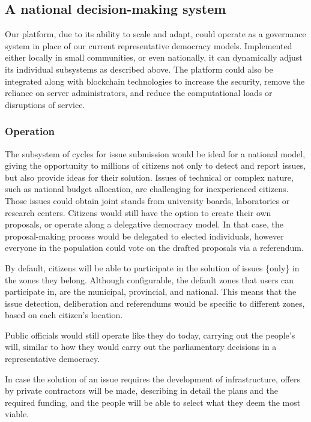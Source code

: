 \documentclass[a4paper,11pt]{article}
\begin{document}
\begin{multicols}{2}
\section{A national decision-making system} \label{national}

Our platform, due to its ability to scale and adapt, could operate as a governance system in place of our current representative democracy models. Implemented either locally in small communities, or even nationally, it can dynamically adjust its individual subsystems as described above. The platform could also be integrated along with blockchain technologies to increase the security, remove the reliance on server administrators, and reduce the computational loads or disruptions of service.

\subsubsection{Operation} \label{operationnational}

The subsystem of cycles for issue submission would be ideal for a national model, giving the opportunity to millions of citizens not only to detect and report issues, but also provide ideas for their solution. Issues of technical or complex nature, such as national budget allocation, are challenging for inexperienced citizens. Those issues could obtain joint stands from university boards, laboratories or research centers. Citizens would still have the option to create their own proposals, or operate along a delegative democracy model. In that case, the proposal-making process would be delegated to elected individuals, however everyone in the population could vote on the drafted proposals via a referendum.

By default, citizens will be able to participate in the solution of issues \{only\} in the zones they belong. Although configurable, the default zones that users can participate in, are the municipal, provincial, and national. This means that the issue detection, deliberation and referendums would be specific to different zones, based on each citizen's location.

Public officials would still operate like they do today, carrying out the people's will, similar to how they would carry out the parliamentary decisions in a representative democracy.

In case the solution of an issue requires the development of infrastructure, offers by private contractors will be made, describing in detail the plans and the required funding, and the people will be able to select what they deem the most viable.


\end{multicols}
\end{document}
